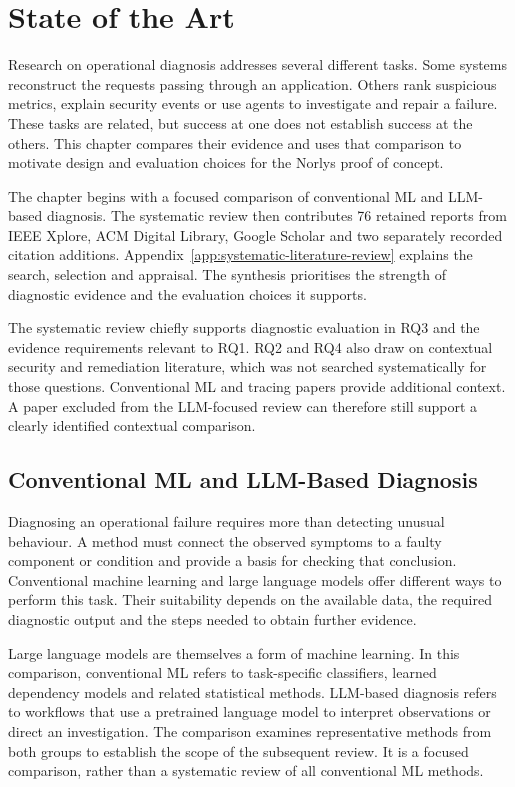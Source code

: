 \chapter{State of the Art}
\label{cha:state-of-the-art}

Research on operational diagnosis addresses several different tasks. Some
systems reconstruct the requests passing through an application. Others
rank suspicious metrics, explain security events or use agents to investigate
and repair a failure. These tasks are related, but success at one does not
establish success at the others. This chapter compares their evidence and
uses that comparison to motivate design and evaluation choices for the
Norlys proof of concept.

The chapter begins with a focused comparison of conventional ML and
LLM-based diagnosis. The systematic review then contributes 76 retained
reports from IEEE Xplore, ACM Digital Library, Google Scholar and two
separately recorded citation additions. Appendix~\ref{app:systematic-literature-review}
explains the search, selection and appraisal. The synthesis prioritises the
strength of diagnostic evidence and the evaluation choices it supports.

The systematic review chiefly supports diagnostic evaluation in RQ3 and
the evidence requirements relevant to RQ1. RQ2 and RQ4 also draw on
contextual security and remediation literature, which was not searched
systematically for those questions. Conventional ML and tracing papers
provide additional context. A paper excluded from the LLM-focused review
can therefore still support a clearly identified contextual comparison.

\section{Conventional ML and LLM-Based Diagnosis}
\label{sec:state-of-the-art:ml-llm}

Diagnosing an operational failure requires more than detecting unusual
behaviour. A method must connect the observed symptoms to a faulty component
or condition and provide a basis for checking that conclusion. Conventional
machine learning and large language models offer different ways to perform
this task. Their suitability depends on the available data, the required
diagnostic output and the steps needed to obtain further evidence.

Large language models are themselves a form of machine learning. In this
comparison, conventional ML refers to task-specific classifiers, learned
dependency models and related statistical methods. LLM-based diagnosis
refers to workflows that use a pretrained language model to interpret
observations or direct an investigation. The comparison examines
representative methods from both groups to establish the scope of the
subsequent review. It is a focused comparison, rather than a systematic
review of all conventional ML methods.

